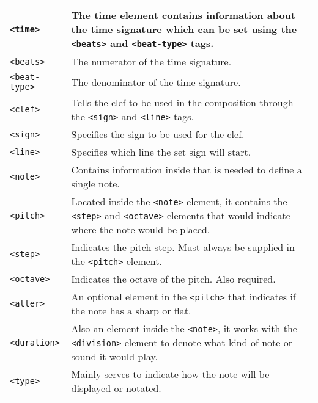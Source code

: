 \begin{longtable}{|p{3.6cm}|p{10cm}|}
        \texttt{<time>} & The time element contains information about the time signature which can be set using the \texttt{<beats>} and \texttt{<beat-type>} tags. \\ \hline
        
        \texttt{<beats>} & The numerator of the time signature. \\ \hline
        
        \texttt{<beat-type>} & The denominator of the time signature. \\ \hline
        
        \texttt{<clef>} & Tells the clef to be used in the composition through the \texttt{<sign>} and \texttt{<line>} tags. \\ \hline
        
        \texttt{<sign>} & Specifies the sign to be used for the clef.\\ \hline
        
        \texttt{<line>} & Specifies which line the set sign will start. \\ \hline
        
        \texttt{<note>} & Contains information inside that is needed to define a single note. \\ \hline
        
        \texttt{<pitch>} & Located inside the \texttt{<note>} element, it contains the \texttt{<step>} and \texttt{<octave>} elements that would indicate where the note would be placed. \\ \hline
        
        \texttt{<step>} & Indicates the pitch step. Must always be supplied in the \texttt{<pitch>} element. \\ \hline
        
        \texttt{<octave>} & Indicates the octave of the pitch. Also required. \\ \hline

        \texttt{<alter>} & An optional element in the \texttt{<pitch>} that indicates if the note has a sharp or flat. \\ \hline
        
        \texttt{<duration>} & Also an element inside the \texttt{<note>}, it works with the \texttt{<division>} element to denote what kind of note or sound it would play. \\ \hline
        
        \texttt{<type>} & Mainly serves to indicate how the note will be displayed or notated. \\ \hline


\end{longtable}


